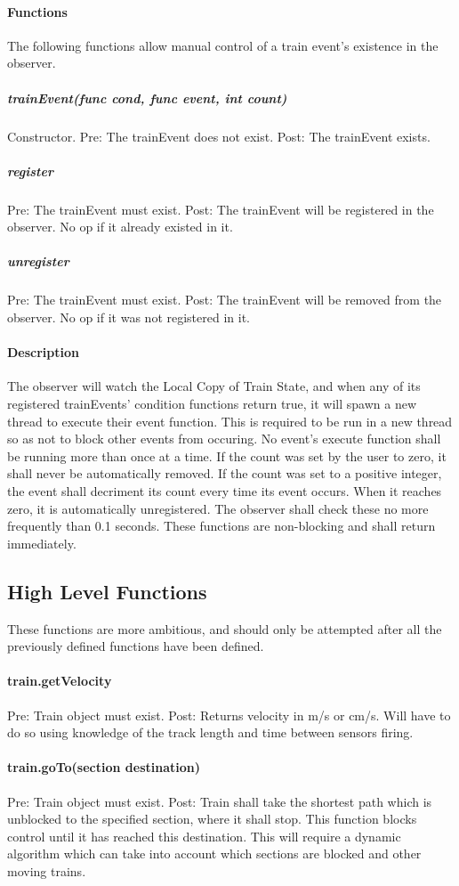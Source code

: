 \documentclass[a4paper,11pt,notitlepage]{article}
\def\LC{Local Copy of Train State\xspace}
\begin{document}
\paragraph{Functions}
The following functions allow manual control of a train event's existence in the observer.
\subparagraph{trainEvent(func cond, func event, int count)} Constructor. Pre: The trainEvent does not exist. Post: The trainEvent exists.
\subparagraph{register} Pre: The trainEvent must exist. Post: The trainEvent will be registered in the observer. No op if it already existed in it.
\subparagraph{unregister} Pre: The trainEvent must exist. Post: The trainEvent will be removed from the observer. No op if it was not registered in it.
\paragraph{Description}
The observer will watch the \LC, and when any of its registered trainEvents' condition functions return true, it will spawn a new thread to execute their event function. This is required to be run in a new thread so as not to block other events from occuring. No event's execute function shall be running more than once at a time. If the count was set by the user to zero, it shall never be automatically removed. If the count was set to a positive integer, the event shall decriment its count every time its event occurs. When it reaches zero, it is automatically unregistered. The observer shall check these no more frequently than 0.1 seconds.
These functions are non-blocking and shall return immediately.

\subsection{High Level Functions}
These functions are more ambitious, and should only be attempted after all the previously defined functions have been defined.
\paragraph{train.getVelocity} Pre: Train object must exist. Post: Returns velocity in m/s or cm/s. Will have to do so using knowledge of the track length and time between sensors firing.
\paragraph{train.goTo(section destination)} Pre: Train object must exist. Post: Train shall take the shortest path which is unblocked to the specified section, where it shall stop. This function blocks control until it has reached this destination. This will require a dynamic algorithm which can take into account which sections are blocked and other moving trains.
\end{document}
